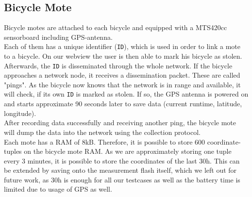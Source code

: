 \documentclass[a4paper]{article}
\newcommand{\mts}{MTS420cc }
\begin{document}
\subsection{Bicycle Mote}
Bicycle motes are attached to each bicycle and equipped with a \mts sensorboard including GPS-antenna.\\
Each of them has a unique identifier (\texttt{ID}), which is used in order to link a mote to a bicycle. On our webview the user is then able to mark his bicycle as stolen. Afterwards, the \texttt{ID} is disseminated through the whole network. If the bicycle approaches a network node, it receives a dissemination packet. These are called "pings". As the bicycle now knows that the network is in range and available, it will check, if its own \texttt{ID} is marked as stolen. If so, the GPS antenna is powered on and starts approximate 90 seconds later to save data (current runtime, latitude, longitude).\\
After recording data successfully and receiving another ping, the bicycle mote will dump the data into the network using the collection protocol.\\

Each mote has a RAM of 8kB. Therefore, it is possible to store 600 coordinate-tuples on the bicycle mote RAM. As we are approximately storing one tuple every 3 minutes, it is possible to store the coordinates of the last 30h. This can be extended by saving onto the measurement flash itself, which we left out for future work, as 30h is enough for all our testcases as well as the battery time is limited due to usage of GPS as well.
\end{document}

